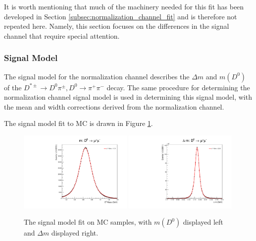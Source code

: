 It is worth mentioning that much of the machinery needed for this fit has been developed in Section \ref{subsec:normalization_channel_fit} and is therefore not repeated here. Namely, this section focuses on the differences in the signal channel that require special attention.

\subsubsection{Signal Model}

The signal model for the normalization channel describes the $\Delta m$ and $m(D^0)$ of the $D^{*\pm}\to D^0 \pi^\pm, D^0 \to \pi^+ \pi^-$ decay. The same procedure for determining the normalization channel signal model is used in determining this signal model, with the mean and width corrections derived from the normalization channel.

The signal model fit to MC is drawn in Figure \ref{fig:d0mumu_uml_fit}.

\begin{figure}[htp]
    \begin{center}
      \includegraphics[width=0.49\textwidth]{figures/chapter4/signal_fit/d0mm_2022_2023_0_m.pdf}
      \includegraphics[width=0.49\textwidth]{figures/chapter4/signal_fit/d0mm_2022_2023_0_dm.pdf}\\
    \end{center}
    \caption{
      The signal model fit on MC samples, with $m(D^0)$ displayed left and $\Delta m$ displayed right.
    }
    \label{fig:d0mumu_uml_fit}
\end{figure}

